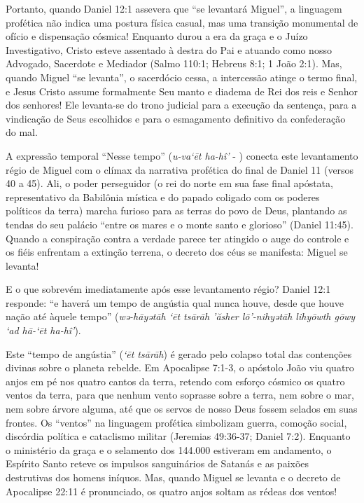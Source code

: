 Portanto, quando Daniel 12:1 assevera que ``se levantará Miguel'', a linguagem profética não indica uma postura física casual, mas uma transição monumental de ofício e dispensação cósmica! Enquanto durou a era da graça e o Juízo Investigativo, Cristo esteve assentado à destra do Pai e atuando como nosso Advogado, Sacerdote e Mediador (Salmo 110:1; Hebreus 8:1; 1 João 2:1). Mas, quando Miguel ``se levanta'', o sacerdócio cessa, a intercessão atinge o termo final, e Jesus Cristo assume formalmente Seu manto e diadema de Rei dos reis e Senhor dos senhores! Ele levanta-se do trono judicial para a execução da sentença, para a vindicação de Seus escolhidos e para o esmagamento definitivo da confederação do mal.

A expressão temporal ``Nesse tempo'' (\textit{u-va‘ēt ha-hî’} - ) conecta este levantamento régio de Miguel com o clímax da narrativa profética do final de Daniel 11 (versos 40 a 45). Ali, o poder perseguidor (o rei do norte em sua fase final apóstata, representativo da Babilônia mística e do papado coligado com os poderes políticos da terra) marcha furioso para as terras do povo de Deus, plantando as tendas do seu palácio ``entre os mares e o monte santo e glorioso'' (Daniel 11:45). Quando a conspiração contra a verdade parece ter atingido o auge do controle e os fiéis enfrentam a extinção terrena, o decreto dos céus se manifesta: Miguel se levanta!

E o que sobrevém imediatamente após esse levantamento régio? Daniel 12:1 responde: ``e haverá um tempo de angústia qual nunca houve, desde que houve nação até àquele tempo'' (\textit{wə-hāyətāh ‘ēt tsārāh ’ăsher lō’-nihyətāh lihyōwth gōwy ‘ad hā-‘ēt ha-hî’}).

Este ``tempo de angústia'' (\textit{‘ēt tsārāh}) é gerado pelo colapso total das contenções divinas sobre o planeta rebelde. Em Apocalipse 7:1-3, o apóstolo João viu quatro anjos em pé nos quatro cantos da terra, retendo com esforço cósmico os quatro ventos da terra, para que nenhum vento soprasse sobre a terra, nem sobre o mar, nem sobre árvore alguma, até que os servos de nosso Deus fossem selados em suas frontes. Os ``ventos'' na linguagem profética simbolizam guerra, comoção social, discórdia política e cataclismo militar (Jeremias 49:36-37; Daniel 7:2). Enquanto o ministério da graça e o selamento dos 144.000 estiveram em andamento, o Espírito Santo reteve os impulsos sanguinários de Satanás e as paixões destrutivas dos homens iníquos. Mas, quando Miguel se levanta e o decreto de Apocalipse 22:11 é pronunciado, os quatro anjos soltam as rédeas dos ventos!

